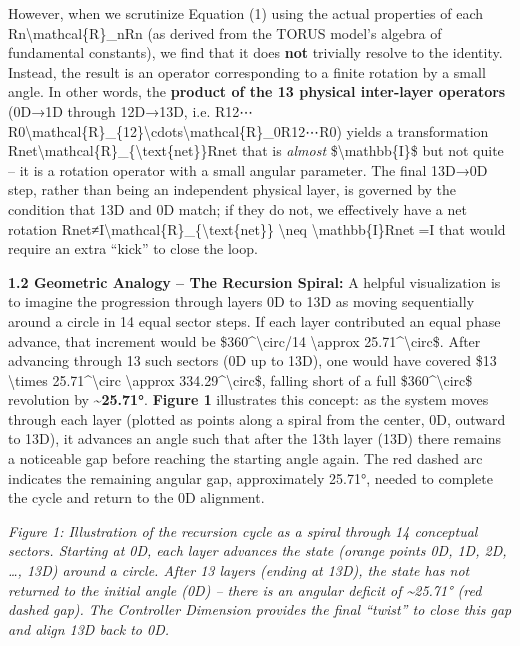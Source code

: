 \documentclass[]{article}
\begin{document}
However, when we scrutinize Equation (1) using the actual properties of
each Rn\textbackslash{}mathcal\{R\}\_nRn​ (as derived from the TORUS
model's algebra of fundamental constants), we find that it does
\textbf{not} trivially resolve to the identity. Instead, the result is
an operator corresponding to a finite rotation by a small angle. In
other words, the \textbf{product of the 13 physical inter-layer
operators} (0D→1D through 12D→13D, i.e.
R12⋯R0\textbackslash{}mathcal\{R\}\_\{12\}\textbackslash{}cdots\textbackslash{}mathcal\{R\}\_0R12​⋯R0​)
yields a transformation
Rnet\textbackslash{}mathcal\{R\}\_\{\textbackslash{}text\{net\}\}Rnet​
that is \emph{almost} \$\textbackslash{}mathbb\{I\}\$ but not quite --
it is a rotation operator with a small angular parameter. The final
13D→0D step, rather than being an independent physical layer, is
governed by the condition that 13D and 0D match; if they do not, we
effectively have a net rotation
Rnet≠I\textbackslash{}mathcal\{R\}\_\{\textbackslash{}text\{net\}\}
\textbackslash{}neq \textbackslash{}mathbb\{I\}Rnet​=I that would
require an extra ``kick'' to close the loop.

\textbf{1.2 Geometric Analogy -- The Recursion Spiral:} A helpful
visualization is to imagine the progression through layers 0D to 13D as
moving sequentially around a circle in 14 equal sector steps. If each
layer contributed an equal phase advance, that increment would be
\$360\^{}\textbackslash{}circ/14 \textbackslash{}approx
25.71\^{}\textbackslash{}circ\$. After advancing through 13 such sectors
(0D up to 13D), one would have covered \$13 \textbackslash{}times
25.71\^{}\textbackslash{}circ \textbackslash{}approx
334.29\^{}\textbackslash{}circ\$, falling short of a full
\$360\^{}\textbackslash{}circ\$ revolution by
\textbf{\textasciitilde{}25.71°}. \textbf{Figure 1} illustrates this
concept: as the system moves through each layer (plotted as points along
a spiral from the center, 0D, outward to 13D), it advances an angle such
that after the 13th layer (13D) there remains a noticeable gap before
reaching the starting angle again. The red dashed arc indicates the
remaining angular gap, approximately 25.71°, needed to complete the
cycle and return to the 0D alignment.

\emph{Figure 1: Illustration of the recursion cycle as a spiral through
14 conceptual sectors. Starting at 0D, each layer advances the state
(orange points 0D, 1D, 2D, \ldots{}, 13D) around a circle. After 13
layers (ending at 13D), the state has not returned to the initial angle
(0D) -- there is an angular deficit of \textasciitilde{}25.71° (red
dashed gap). The Controller Dimension provides the final ``twist'' to
close this gap and align 13D back to 0D.}
\end{document}
